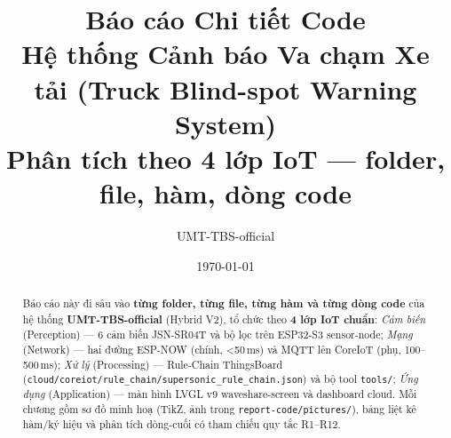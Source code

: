 \documentclass[a4paper,12pt]{report}
\title{\textbf{Báo cáo Chi tiết Code\\[6pt]
\large Hệ thống Cảnh báo Va chạm Xe tải (Truck Blind-spot Warning System)\\
Phân tích theo 4 lớp IoT — folder, file, hàm, dòng code}}
\author{UMT-TBS-official}
\date{\today}
\newcommand{\code}[1]{\texttt{#1}}
\begin{document}
\maketitle

\begin{abstract}
\noindent
Báo cáo này đi sâu vào \textbf{từng folder, từng file, từng hàm và từng dòng
code} của hệ thống \textbf{UMT-TBS-official} (Hybrid V2), tổ chức theo \textbf{4
lớp IoT chuẩn}: \emph{Cảm biến} (Perception) — 6 cảm biến JSN-SR04T và bộ lọc
trên ESP32-S3 sensor-node; \emph{Mạng} (Network) — hai đường ESP-NOW (chính,
\textless{}50\,ms) và MQTT lên CoreIoT (phụ, 100--500\,ms); \emph{Xử lý}
(Processing) — Rule-Chain ThingsBoard
(\code{cloud/coreiot/rule\_chain/supersonic\_rule\_chain.json}) và bộ tool
\code{tools/}; \emph{Ứng dụng} (Application) — màn hình LVGL v9
waveshare-screen và dashboard cloud. Mỗi chương gồm sơ đồ minh hoạ (TikZ, ảnh
trong \code{report-code/pictures/}), bảng liệt kê hàm/ký hiệu và phân tích
dòng-cuối có tham chiếu quy tắc R1--R12.
\end{abstract}

\tableofcontents
\newpage

\end{document}

